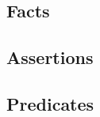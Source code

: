 \documentclass[11pt,titlepage]{article} %
\begin{document}
	\subsection{Facts}
		
	\subsection{Assertions}
		
	\newpage
	\subsection{Predicates}
		
	\newpage
\end{document}
